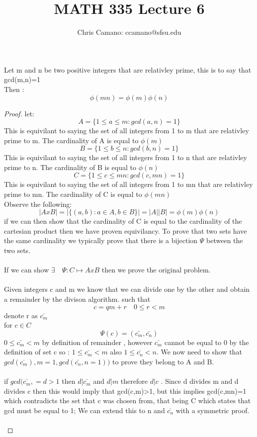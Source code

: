 \documentclass[11pt]{article}
\author{Chris Camano: ccamano@sfsu.edu}
\title{MATH 335  Lecture 6 }
\date
\theoremstyle{definition}  %
\begin{document}
\maketitle
\prop Let m and n be two positive integers that are relativley prime, this is to say that gcd(m,n)=1\\ Then :
\[
  \phi(mn)=\phi(m)\phi(n)
\]
\begin{proof}
  let:
  \[
    A=\{1\leq a\leq m: gcd(a,n)=1\}
  \]
  This is equivilant to saying the set of all integers from 1 to m that are relativley prime to m. The cardinality of A is equal to $\phi(m)$
\\
\[
  B=\{1 \leq b\leq n: gcd(b,n)=1\}
\]
This is equivilant to saying the set of all integers from 1 to n that are relativley prime to n. The cardinality of B is equal to $\phi(n)$ \\
\[
  C=\{1\leq c \leq mn: gcd(c, mn )=1 \}
\]
This is equivilant to saying the set of all integers from 1 to mn that are relativley prime to mn. The cardinality of C is equal to $\phi(mn)$ \\
Observe the following:
\[
  |Ax B|=|\{(a,b):a\in A, b\in B\}|=|A||B|=\phi(m)\phi(n)
\]
if we can then show that the cardinality of C is equal to the cardinality of the cartesian product then we have proven equivilancy. To prove that two sets have the same cardinality we typically prove that there is a bijection $\Psi$ between the two sets. \\\\
If we can show $\exists \quad \Psi : C\mapsto AxB$ then we prove the original problem. \\\\
Given integers c and m we know that we can divide one by the other and obtain a remainder by the divison algorithm. such that \[
  c=qm +r\quad 0\leq r < m
\]
denote r as $\bar{c_m}$\\
for $c\in C$
\[
  \Psi(c)=(\bar{c_m},\bar{c_n})
\]
$0\leq \bar{c_m}< m $ by definition of remainder , however $\bar{c_m}$ cannot be equal to 0 by the definition of set c so : $1\leq \bar{c_m}< m $
also  $1\leq \bar{c_n}< n$. We now need to show that $gcd(\bar{c_m}),m=1, gcd(\bar{c_n},n=1))$ to prove they belong to A and B. \\\\
if $gcd(\bar{c_m},=d>1$ then $d|\bar{c_m}$ and $d|m$ therefore $d|c$ . Since d divides m and d divides c then this would imply that gcd(c,m)>1, but this implies gcd(c,mn)=1 which contradicts the set that c was chosen from, that being C which states that gcd must be equal to 1; We can extend this to n and $\bar{c_n}$ with a symmetric proof. \\\\

\end{proof}
\end{document}
